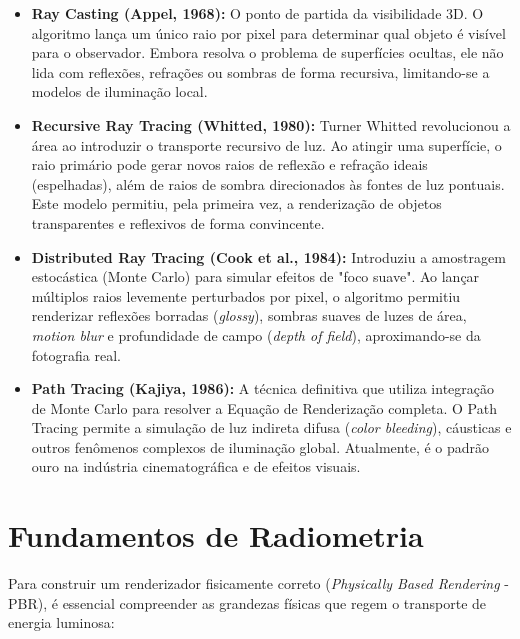 \begin{itemize}
    \item \textbf{Ray Casting (Appel, 1968):} O ponto de partida da visibilidade 3D. O algoritmo lança um único raio por pixel para determinar qual objeto é visível para o observador. Embora resolva o problema de superfícies ocultas, ele não lida com reflexões, refrações ou sombras de forma recursiva, limitando-se a modelos de iluminação local.
    \item \textbf{Recursive Ray Tracing (Whitted, 1980):} Turner Whitted revolucionou a área ao introduzir o transporte recursivo de luz. Ao atingir uma superfície, o raio primário pode gerar novos raios de reflexão e refração ideais (espelhadas), além de raios de sombra direcionados às fontes de luz pontuais. Este modelo permitiu, pela primeira vez, a renderização de objetos transparentes e reflexivos de forma convincente.
    \item \textbf{Distributed Ray Tracing (Cook et al., 1984):} Introduziu a amostragem estocástica (Monte Carlo) para simular efeitos de "foco suave". Ao lançar múltiplos raios levemente perturbados por pixel, o algoritmo permitiu renderizar reflexões borradas (\textit{glossy}), sombras suaves de luzes de área, \textit{motion blur} e profundidade de campo (\textit{depth of field}), aproximando-se da fotografia real.
    \item \textbf{Path Tracing (Kajiya, 1986):} A técnica definitiva que utiliza integração de Monte Carlo para resolver a Equação de Renderização completa. O Path Tracing permite a simulação de luz indireta difusa (\textit{color bleeding}), cáusticas e outros fenômenos complexos de iluminação global. Atualmente, é o padrão ouro na indústria cinematográfica e de efeitos visuais.
\end{itemize}

\section{Fundamentos de Radiometria}

Para construir um renderizador fisicamente correto (\textit{Physically Based Rendering} - PBR), é essencial compreender as grandezas físicas que regem o transporte de energia luminosa:


